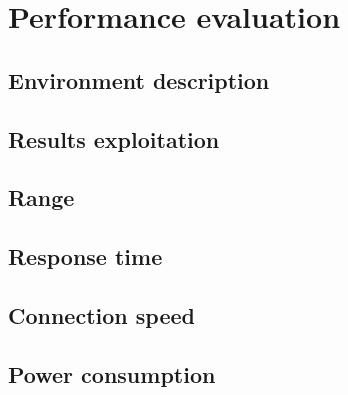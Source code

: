 \section{Performance evaluation}

\subsection{Environment description}

\subsection{Results exploitation}

\subsection{Range}

\subsection{Response time}

\subsection{Connection speed}

\subsection{Power consumption}
